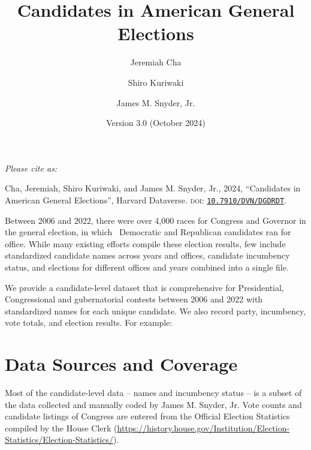 \documentclass[12pt]{article}
\title{\Large\textbf{Candidates in American General Elections}}
\author[1]{\normalsize Jeremiah Cha}
\author[2]{\normalsize Shiro Kuriwaki}
\author[1]{\normalsize James M. Snyder, Jr.}
\affil[1]{\footnotesize Department of Government, Harvard University.}
\affil[2]{\footnotesize Department of Political Science and Institution of Social and Policy Studies, Yale University}
\date{\vspace{-0.2in} \normalsize Version 3.0 (October 2024)}
\begin{document}
\maketitle

\vspace{-0.2in}

\begin{center}
\begin{minipage}{0.75\linewidth}
\small

\emph{Please cite as: }

Cha, Jeremiah, Shiro Kuriwaki, and James M. Snyder, Jr., 2024, ``Candidates in American General Elections'', Harvard Dataverse. \textsc{doi}: \href{https://doi.org/10.7910/DVN/DGDRDT}{\texttt{10.7910/DVN/DGDRDT}}.
\end{minipage}
\end{center}
\smallskip

Between 2006 and 2022, there were over 4,000 races for Congress and Governor in the general election, in which \unskip \ Democratic and Republican candidates ran for office.
While many existing efforts compile these election results, few include standardized candidate names across years and offices, candidate incumbency status, and elections for different offices and years combined into a single file.

We provide a candidate-level dataset that is comprehensive for Presidential, Congressional and gubernatorial contests between 2006 and 2022 with standardized names for each unique candidate. We also record party, incumbency, vote totals, and election results. For example:

\begin{table}[!h]
\centering
\footnotesize

\end{table}

\newpage

\section{Data Sources and Coverage}

Most of the candidate-level data -- names and incumbency status -- is a subset of the data collected and manually coded by James M. Snyder, Jr. Vote counts and candidate listings of Congress are entered from the Official Election Statistics compiled by the House Clerk (\url{https://history.house.gov/Institution/Election-Statistics/Election-Statistics/}).
\end{document}
